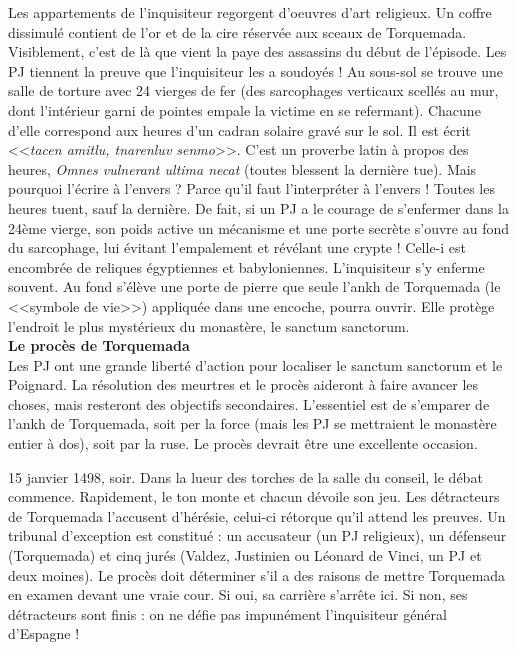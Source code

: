 \documentclass[11pt,twoside,a4paper]{book}
\begin{document}
Les appartements de l'inquisiteur regorgent d'oeuvres d'art religieux. Un coffre dissimul{\'e} contient de l'or et de la cire r{\'e}serv{\'e}e aux sceaux de Torquemada. Visiblement, c'est de l{\`a} que vient la paye des assassins du d{\'e}but de l'{\'e}pisode. Les PJ tiennent la preuve que l'inquisiteur les a soudoy{\'e}s ! Au sous-sol se trouve une salle de torture avec 24 vierges de fer (des sarcophages verticaux scell{\'e}s au mur, dont l'int{\'e}rieur garni de pointes empale la victime en se refermant). Chacune d'elle correspond aux heures d'un cadran solaire grav{\'e} sur le sol. Il est {\'e}crit <<\emph{tacen amitlu, tnarenluv senmo}>>. C'est un proverbe latin {\`a} propos des heures, \emph{Omnes vulnerant ultima necat} (toutes blessent la derni{\`e}re tue). Mais pourquoi l'{\'e}crire {\`a} l'envers ? Parce qu'il faut l'interpr{\'e}ter {\`a} l'envers ! Toutes les heures tuent, sauf la derni{\`e}re. De fait, si un PJ a le courage de s'enfermer dans la 24{\`e}me vierge, son poids active un m{\'e}canisme et une porte secr{\`e}te s'ouvre au fond du sarcophage, lui {\'e}vitant l'empalement et r{\'e}v{\'e}lant une crypte ! Celle-i est encombr{\'e}e de reliques {\'e}gyptiennes et babyloniennes. L'inquisiteur s'y enferme souvent. Au fond s'{\'e}l{\`e}ve une porte de pierre que seule l'ankh de Torquemada (le <<symbole de vie>>) appliqu{\'e}e dans une encoche, pourra ouvrir. Elle prot{\`e}ge l'endroit le plus myst{\'e}rieux du monast{\`e}re, le sanctum sanctorum.~\\

\textbf{\large Le proc{\`e}s de Torquemada}~\\

Les PJ ont une grande libert{\'e} d'action pour localiser le sanctum sanctorum et le Poignard. La r{\'e}solution des meurtres et le proc{\`e}s aideront {\`a} faire avancer les choses, mais resteront des objectifs secondaires. L'essentiel est de s'emparer de l'ankh de Torquemada, soit per la force (mais les PJ se mettraient le monast{\`e}re entier {\`a} dos), soit par la ruse. Le proc{\`e}s devrait {\^e}tre une excellente occasion.~\\

\clearpage

15 janvier 1498, soir. Dans la lueur des torches de la salle du conseil, le d{\'e}bat commence. Rapidement, le ton monte et chacun d{\'e}voile son jeu. Les d{\'e}tracteurs de Torquemada l'accusent d'h{\'e}r{\'e}sie, celui-ci r{\'e}torque qu'il attend les preuves. Un tribunal d'exception est constitu{\'e} : un accusateur (un PJ religieux), un d{\'e}fenseur (Torquemada) et cinq jur{\'e}s (Valdez, Justinien ou L{\'e}onard de Vinci, un PJ et deux moines). Le proc{\`e}s doit d{\'e}terminer s'il a des raisons de mettre Torquemada en examen devant une vraie cour. Si oui, sa carri{\`e}re s'arr{\^e}te ici. Si non, ses d{\'e}tracteurs sont finis : on ne d{\'e}fie pas impun{\'e}ment l'inquisiteur g{\'e}n{\'e}ral d'Espagne !~\\
\end{document}
